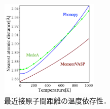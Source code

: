 \documentclass[10pt,twocolumn,a4j]{jsarticle}
\begin{document}
\begin{figure}[htb]
\begin{minipage}{0.245\hsize}
\begin{center}
\end{center}
\end{minipage}
 \begin{minipage}{0.245\hsize}
\begin{center}
\includegraphics[width=4.7cm]{./image_result/Al_lat_label.eps}
\end{center}
\end{minipage}
 \caption{最近接原子間距離の温度依存性．}
\end{figure}
\end{document}
